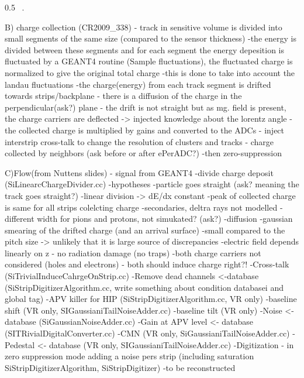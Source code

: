                  {0.5}       %
                 { ~\cite{website:simuBasics}. }


B) charge collection (CR2009\_338)
- track in sensitive volume is divided into small segments of the same size (compared to the sensor thickness)
-the energy is divided between these segments and for each segment the energy depesition is fluctuated by a GEANT4 routine (Sample fluctuations), the fluctuated charge is normalized to give the original total charge
-this is done to take into account the landau fluctuations
-the charge(energy) from each track segment is drifted towards strips/backplane
- there is a diffusion of the charge in the perpendicular(ask?) plane
- the drift is not straight but as mg. field is present, the charge carriers are deflected -> injected knowledge about the lorentz angle
- the collected charge is multiplied by gains and converted to the ADCs
- inject interstrip cross-talk to change the resolution of clusters and tracks - charge collected by neighbors (ask before or after ePerADC?)
-then zero-suppression

C)Flow(from Nuttens slides)
- signal from GEANT4
-divide charge deposit (SiLinearcChargeDivider.cc)
	-hypotheses
	-particle goes straight (ask? meaning the track goes straight?)
	-linear division -> dE/dx constant
	-peak of collected charge is same for all strips colelcting charge
	-secondaries, deltra rays not modelled
        -different width for pions and protons, not simukated? (ask?)
-diffusion
	-gaussian smearing of the drifted charge (and an arrival surface)
	-small compared to the pitch size -> unlikely that it is large source of discrepancies
	-electric field depends linearly on z
	- no radiation damage (no traps)
	-both charge carriers not considered (holes and electrons) - both should induce charge right?!
-Cross-talk (SiTrivialInduceCahrgeOnStrip.cc)
-Remove dead channels <-database (SiStripDigitizerAlgorithm.cc, write something about condition databasei and global tag)
-APV killer for HIP (SiStripDigitizerAlgorithm.cc, VR only)
-baseline shift (VR only, SIGaussianiTailNoiseAdder.cc)
-baseline tilt (VR only)
-Noise <- database (SiGaussianNoiseAdder.cc)
-Gain at APV level <- database (SITRivialDigitalConverter.cc)
-CMN (VR only, SiGaussianiTailNoiseAdder.cc)
-Pedestal <- database (VR only, SIGaussianiTailNoiseAdder.cc)
-Digitization - in zero suppression mode adding a noise pers strip (including saturation SiStripDigitizerAlgorithm, SiStripDigitizer)
-to be reconstructed

